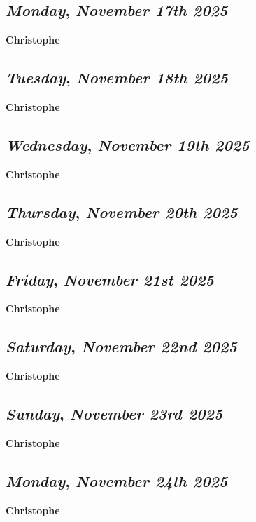 \def\day{\textit{November 17th 2025}}
\def\weekday{\textit{Monday}}
\subsection*{\weekday, \day}
\textbf {Christophe}

\def\day{\textit{November 18th 2025}}
\def\weekday{\textit{Tuesday}}
\subsection*{\weekday, \day}
\textbf {Christophe}

\def\day{\textit{November 19th 2025}}
\def\weekday{\textit{Wednesday}}
\subsection*{\weekday, \day}
\textbf {Christophe}

\def\day{\textit{November 20th 2025}}
\def\weekday{\textit{Thursday}}
\subsection*{\weekday, \day}
\textbf {Christophe}

\def\day{\textit{November 21st 2025}}
\def\weekday{\textit{Friday}}
\subsection*{\weekday, \day}
\textbf {Christophe}

\def\day{\textit{November 22nd 2025}}
\def\weekday{\textit{Saturday}}
\subsection*{\weekday, \day}
\textbf {Christophe}

\def\day{\textit{November 23rd 2025}}
\def\weekday{\textit{Sunday}}
\subsection*{\weekday, \day}
\textbf {Christophe}

\def\day{\textit{November 24th 2025}}
\def\weekday{\textit{Monday}}
\subsection*{\weekday, \day}
\textbf {Christophe}

\def\day{\textit{November 25th 2025}}
\def\weekday{\textit{Tuesday}}
